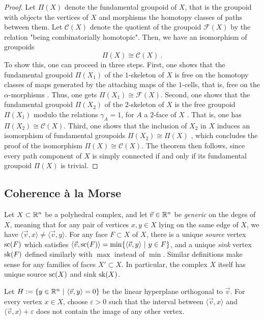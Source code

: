 \begin{proof}
    Let $\Pi(X)$ denote the fundamental groupoid of $X$, that is the groupoid with objects the vertices of $X$ and morphisms the homotopy classes of paths between them.
    Let $\mathcal{C}(X)$ denote the quotient of the groupoid $\mathcal{F}(X)$ by the relation "being combinatorially homotopic". 
    Then, we have an isomorphism of groupoids \[ \Pi(X) \cong \mathcal{C}(X) \ . \]
    To show this, one can proceed in three steps. 
    First, one shows that the fundamental groupoid $\Pi(X_1)$ of the $1$-skeleton of $X$ is free on the homotopy classes of maps generated by the attaching maps of the $1$-cells, that is, free on the $\alpha$-morphisms \cite[9.1.5]{Brown2006}.
    Thus, one gets $\Pi(X_1) \cong \mathcal{F}(X)$. 
    Second, one shows that the fundamental groupoid $\Pi(X_2)$ of the $2$-skeleton of $X$ is the free groupoid $\Pi(X_1)$ modulo the relations $\gamma_A=1$, for $A$ a $2$-face of $X$ \cite[9.1.6]{Brown2006}. 
    That is, one has $\Pi(X_2) \cong \mathcal{C}(X)$.
    Third, one shows that the inclusion of $X_2$ in $X$ induces an isomorphism of fundamental groupoids $\Pi(X_2) \cong \Pi(X)$ \cite[9.1.7]{Brown2006}, which concludes the proof of the isomorphism $\Pi(X) \cong \mathcal{C}(X)$.
    The theorem then follows, since every path component of $X$ is simply connected if and only if its fundamental groupoid $\Pi(X)$ is trivial.  
\end{proof}

\subsection{Coherence \`a la Morse}

Let $X\subset \mathbb R^n$ be a polyhedral complex, and let $\vec v \in \mathbb R^n$ be \emph{generic} on the deges of $X$, meaning that for any pair of vertices $x,y \in X$ lying on the same edge of $X$, we have $\langle \vec v , x \rangle \neq \langle \vec v, y\rangle$.  
For any face $F \subset X$ of $X$, there is a unique \emph{source} vertex $\mathrm{sc}(F)$ which satisfies $\langle \vec v , \mathrm{sc}(F) \rangle = \min \{\langle \vec v , y \rangle \ | \ y \in F \}$, and a unique \emph{sink} vertex $\mathrm{sk}(F)$ defined similarly with $\max$ instead of $\min$.
Similar definitions make sense for any families of faces $X' \subset X$.
In particular, the complex $X$ itself has unique source $\mathrm{sc}(X)$ and sink $\mathrm{sk}(X)$. 

Let $H:=\{y \in \mathbb R^n \ | \ \langle \vec v , y \rangle = 0\}$ be the linear hyperplane orthogonal to $\vec v$.  
For every vertex $x \in X$, choose $\varepsilon >0$ such that the interval between $\langle \vec v , x \rangle$ and $\langle \vec v , x \rangle + \varepsilon$ does not contain the image of any other vertex. 

